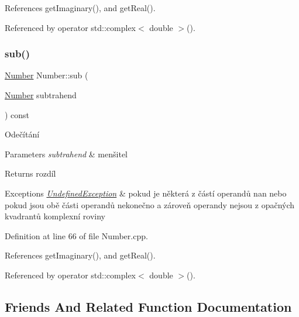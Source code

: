 References get\+Imaginary(), and get\+Real().



Referenced by operator std\+::complex$<$ double $>$().

\mbox{\label{classteam22_1_1_math_1_1_number_a60e8afb7de97804ac0b65bf1db37d0b4}} 
\subsubsection{\texorpdfstring{sub()}{sub()}}
{\footnotesize\ttfamily \hyperlink{classteam22_1_1_math_1_1_number}{Number} Number\+::sub (\begin{DoxyParamCaption}\item[{\hyperlink{classteam22_1_1_math_1_1_number}{Number}}]{subtrahend }\end{DoxyParamCaption}) const}



Odečítání 


\begin{DoxyParams}{Parameters}
{\em subtrahend} & menšitel \\
\hline
\end{DoxyParams}
\begin{DoxyReturn}{Returns}
rozdíl 
\end{DoxyReturn}

\begin{DoxyExceptions}{Exceptions}
{\em \hyperlink{classteam22_1_1_math_1_1_undefined_exception}{Undefined\+Exception}} & pokud je některá z částí operandů nan nebo pokud jsou obě části operandů nekonečno a zároveň operandy nejsou z opačných kvadrantů komplexní roviny \\
\hline
\end{DoxyExceptions}


Definition at line 66 of file Number.\+cpp.



References get\+Imaginary(), and get\+Real().



Referenced by operator std\+::complex$<$ double $>$().



\subsection{Friends And Related Function Documentation}
\mbox{\label{classteam22_1_1_math_1_1_number_a658f07a59742bbb5ce6432e2fd244e8b}} 
